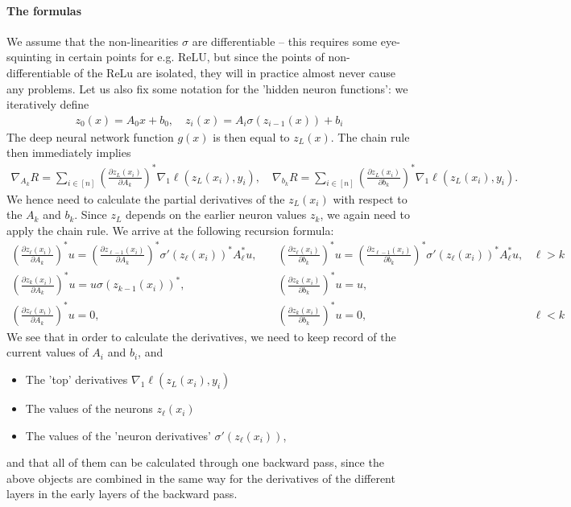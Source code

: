 \documentclass{article}
\newcommand{\ReLU}{\mathrm{ReLU}}
\begin{document}
\paragraph{The formulas}  We assume that the non-linearities $\sigma$ are differentiable -- this requires some eye-squinting in certain points for e.g. $\ReLU$, but since the points of non-differentiable of the ReLu are isolated, they will in practice almost never cause any problems. Let us also fix some notation for the 'hidden neuron functions': we iteratively define
\begin{align*}
    z_0(x) = A_0x+ b_0, \quad z_{i}(x) = A_i\sigma(z_{i-1}(x))+ b_i 
\end{align*}
The deep neural network function $g(x)$ is then equal to $z_L(x)$. The chain rule then immediately implies 
\begin{align}
    \nabla_{A_k} R = \sum_{i \in [n]} \left(\frac{\partial z_{L}(x_i)}{\partial A_k}\right)^*\nabla_1\ell(z_L(x_i),y_i),\quad  \nabla_{b_k} R = \sum_{i \in [n]} \left(\frac{\partial z_{L}(x_i)}{\partial b_k}\right)^*\nabla_1\ell(z_L(x_i),y_i). \label{eq:derivative_risk}
\end{align}
We hence need to calculate the partial derivatives of the $z_L(x_i)$ with respect to the $A_k$ and $b_k$. Since $z_L$ depends on the earlier neuron values $z_k$, we again need to apply the chain rule. We arrive at the following recursion formula:
\begin{align*}
 \left(\frac{\partial z_{\ell}(x_i)}{\partial A_k}\right)^* u =  \left(\frac{\partial z_{\ell-1}(x_i)}{\partial A_k}\right)^*\sigma'(z_\ell(x_i))^*A_\ell^*u, &\quad   \left(\frac{\partial z_{\ell}(x_i)}{\partial b_k}\right)^* u=  \left(\frac{\partial z_{\ell-1}(x_i)}{\partial b_k}\right)^*\sigma'(z_\ell(x_i))^*A_\ell^*u ,  &\ell>k \\
    \left(\frac{\partial z_{k}(x_i)}{\partial A_k}\right)^* u = u \sigma(z_{k-1}(x_i))^*, &\quad   \left(\frac{\partial z_{k}(x_i)}{\partial b_k}\right)^* u = u, & \\
    \left(\frac{\partial z_{\ell}(x_i)}{\partial A_k}\right)^* u = 0, &\quad   \left(\frac{\partial z_{k}(x_i)}{\partial b_k}\right)^* u = 0,  &\ell<k
\end{align*}
We see that in order to calculate the derivatives, we need to keep record of the current values of $A_i$ and $b_i$, and 
\begin{itemize}
    \item The 'top' derivatives $\nabla_1\ell(z_L(x_i),y_i)$
    \item The values of the neurons $z_\ell(x_i)$
    \item The values of the 'neuron derivatives' $\sigma'(z_\ell(x_i))$,
\end{itemize}
and that all of them can be calculated through one backward pass, since the above objects are combined in the same way for the derivatives of the different layers in the early layers of the backward pass.
\end{document}
